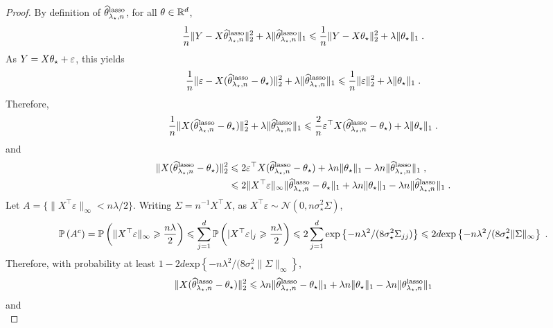 \begin{proof}
By definition of $\widehat{\theta}^{\mathrm{lasso}}_{\lambda_\star,n}$, for all $\theta\in\mathbb{R}^d$,
$$
\frac{1}{n}\|Y - X\widehat{\theta}^{\mathrm{lasso}}_{\lambda_\star,n}\|_2^2 + \lambda\|\widehat{\theta}^{\mathrm{lasso}}_{\lambda_\star,n}\|_1 \leqslant \frac{1}{n}\|Y - X\theta_\star\|_2^2 + \lambda\|\theta_\star\|_1\;.
$$
As $Y = X\theta_\star + \varepsilon$, this yields
$$
\frac{1}{n}\|\varepsilon - X(\widehat{\theta}^{\mathrm{lasso}}_{\lambda_\star,n}-\theta_\star)\|_2^2 + \lambda\|\widehat{\theta}^{\mathrm{lasso}}_{\lambda_\star,n}\|_1 \leqslant \frac{1}{n}\|\varepsilon\|_2^2 + \lambda\|\theta_\star\|_1\;.
$$
Therefore,
$$
\frac{1}{n}\|X(\widehat{\theta}^{\mathrm{lasso}}_{\lambda_\star,n}-\theta_\star)\|_2^2 + \lambda\|\widehat{\theta}^{\mathrm{lasso}}_{\lambda_\star,n}\|_1 \leqslant \frac{2}{n}\varepsilon^\top X(\widehat{\theta}^{\mathrm{lasso}}_{\lambda_\star,n}-\theta_\star) + \lambda\|\theta_\star\|_1\;.
$$
and
\begin{align}
\|X(\widehat{\theta}^{\mathrm{lasso}}_{\lambda_\star,n}-\theta_\star)\|_2^2  &\leqslant 2\varepsilon^\top X(\widehat{\theta}^{\mathrm{lasso}}_{\lambda_\star,n}-\theta_\star) + \lambda n \|\theta_\star\|_1 - \lambda n \|\widehat{\theta}^{\mathrm{lasso}}_{\lambda_\star,n}\|_1\;,\label{eq:lasso:general:bound}\\
&\leqslant 2 \|X^\top \varepsilon\|_\infty \|\widehat{\theta}^{\mathrm{lasso}}_{\lambda_\star,n}-\theta_\star\|_1   + \lambda n \|\theta_\star\|_1 - \lambda n \|\widehat{\theta}^{\mathrm{lasso}}_{\lambda_\star,n}\|_1\;.\nonumber
\end{align}
Let $A = \{\|X^\top\varepsilon\|_\infty < n\lambda / 2\}$. Writing $\Sigma = n^{-1}X^\top X$, as  $X^\top\varepsilon\sim \mathcal{N}(0,n\sigma_\star^2 \Sigma)$,
$$
\mathbb{P}\left(A^c\right) = \mathbb{P}\left(\|X^\top\varepsilon\|_\infty \geqslant \frac{n\lambda}{2}\right) \leqslant \sum_{j=1}^{d} \mathbb{P}\left(|X^\top\varepsilon|_j \geqslant \frac{n\lambda}{2}\right) \leqslant 2\sum_{j=1}^{d}\mathrm{exp}\left\{-n\lambda^2/(8\sigma_\star^2  \Sigma_{jj})\right\} \leqslant 2 d\mathrm{exp}\left\{-n\lambda^2/(8\sigma_\star^2  \|\Sigma\|_\infty\right\}\;.
$$
Therefore, with probability at least $1 - 2 d\mathrm{exp}\left\{-n\lambda^2/(8\sigma_\star^2  \|\Sigma\|_\infty\right\}$,
$$
\|X(\widehat{\theta}^{\mathrm{lasso}}_{\lambda_\star,n}-\theta_\star)\|_2^2  \leqslant  \lambda n  \|\widehat{\theta}^{\mathrm{lasso}}_{\lambda_\star,n}-\theta_\star\|_1   + \lambda n \|\theta_\star\|_1 - \lambda n \|\theta^{\mathrm{lasso}}_{\lambda_\star,n}\|_1
$$
and
$$
$$
\end{proof}
